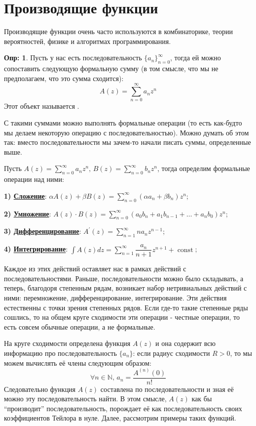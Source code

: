 \documentclass[12pt]{article}
\newcommand{\RN}[1]{%
	\textup{\uppercase\expandafter{\romannumeral#1}}%
}
\newcommand{\MN}{\mathbb{N}}
\theoremstyle{definition}
\newtheorem{defn}{Опр:}
\DeclareMathOperator{\const}{\text{const}}
\newcommand{\ddsum}[2]{\displaystyle\sum\limits_{#1}^{#2}}
\begin{document}
\lhead{Математический анализ - \RN{3}}
\section*{Производящие функции}
Производящие функции очень часто используются в комбинаторике, теории вероятностей, физике и алгоритмах программирования. 

\begin{defn}
	Пусть у нас есть последовательность $\{a_n\}_{n = 0}^{\infty}$, тогда ей можно сопоставить следующую формальную сумму (в том смысле, что мы не предполагаем, что это сумма сходится):
	$$
		A(z) = \ddsum{n = 0}{\infty}a_n z^n
	$$
	Этот объект называется .
\end{defn}

С такими суммами можно выполнять формальные операции (то есть как-будто мы делаем некоторую операцию с последовательностью). Можно думать об этом так: вместо последовательности мы зачем-то начали писать суммы, определенные выше.  

Пусть $A(z) = \ddsum{n = 0}{\infty}a_n z^n, \, B(z) = \ddsum{n = 0}{\infty}b_n z^n$, тогда определим формальные операции над ними:

\textbf{1) \uline{Сложение}}: $\alpha A(z) + \beta B(z) = \ddsum{n = 0}{\infty}\left(\alpha a_n + \beta b_n\right)z^n$;

\textbf{2) \uline{Умножение}}: $A(z){\cdot}B(z) = \ddsum{n = 0}{\infty}\left(a_0 b_n + a_1 b_{n-1} + \dotsc + a_n b_0\right)z^n$;

\textbf{3) \uline{Дифференцирование}}: $A^\prime(z) = \ddsum{n = 1}{\infty}n a_n z^{n-1}$;

\textbf{4) \uline{Интегрирование}}: $\displaystyle \int  A(z)dz = \ddsum{n = 1}{\infty}\dfrac{a_n}{n+1}z^{n+1} + \const$;

Каждое из этих действий оставляет нас в рамках действий с последовательностями. Раньше, последовательности можно было складывать, а теперь, благодоря степенным рядам, возникает набор нетривиальных действий с ними: перемножение, дифференцирование, интегрирование. Эти действия естественны с точки зрения степенных рядов. Если где-то такие степенные ряды сошлись, то на общем круге сходимости эти операции - честные операции, то есть совсем обычные операции, а не формальные. 

На круге сходимости определена функция $A(z)$ и она содержит всю информацию про последовательность $\{a_n\}$: если радиус сходимости $R > 0$, то мы можем вычислять её члены следующим образом:
$$
	\forall n \in \MN, \, a_n = \dfrac{A^{(n)}(0)}{n!}
$$
Следовательно функция $A(z)$ составлена по последовательности и зная её можно эту последовательность найти. В этом смысле, $A(z)$ как бы ``производит'' последовательность, порождает её как последовательность своих коэффициентов Тейлора в нуле. Далее, рассмотрим примеры таких функций.
\end{document}
